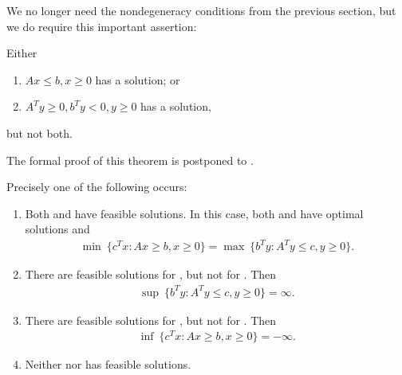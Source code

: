 We no longer need the nondegeneracy conditions from the previous section, but we do require this important assertion:

\begin{theorem}
Either 
\begin{enumerate}
    \item $Ax \le b, x \ge 0$ has a solution; or
    \item $A^T y \ge 0, b^T y < 0, y \ge 0$ has a solution,
\end{enumerate}
but not both.
\end{theorem}

The formal proof of this theorem is postponed to .

\begin{theorem}
Precisely one of the following occurs:
\begin{enumerate}
    \item Both  and  have feasible solutions.
    In this case, both  and  have optimal solutions and
    \begin{align}
    \min \ \{ c^T x : Ax \ge b, x \ge 0 \} = \max \ \{ b^T y : A^T y \le c, y \ge 0 \}.
    \end{align}
    \item There are feasible solutions for , but not for . 
    Then
    \begin{align}
    \sup \ \{ b^T y : A^T y \le c, y \ge 0 \} = \infty.    
    \end{align}
    \item There are feasible solutions for , but not for . 
    Then 
    \begin{align}
    \inf \ \{ c^T x : Ax \ge b, x \ge 0 \} = -\infty.
    \end{align}
    \item Neither  nor  has feasible solutions.
    \end{enumerate}
\end{theorem}

